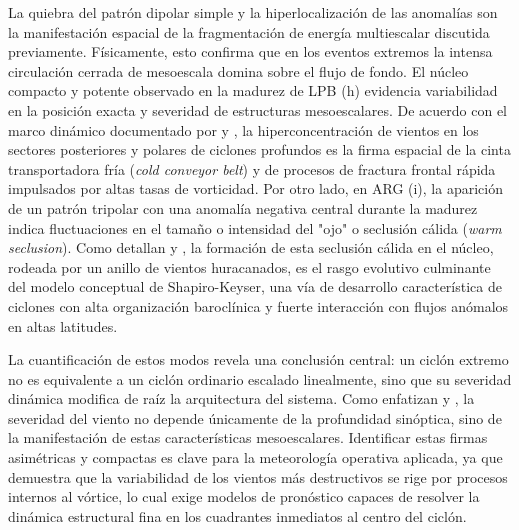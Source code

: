 La quiebra del patrón dipolar simple y la hiperlocalización de las anomalías son la manifestación espacial de la fragmentación de energía multiescalar discutida previamente. Físicamente, esto confirma que en los eventos extremos la intensa circulación cerrada de mesoescala domina sobre el flujo de fondo. El núcleo compacto y potente observado en la madurez de LPB (h) evidencia variabilidad en la posición exacta y severidad de estructuras mesoescalares. De acuerdo con el marco dinámico documentado por \citet{clark2005sting} y \citet{han2025system}, la hiperconcentración de vientos en los sectores posteriores y polares de ciclones profundos es la firma espacial de la cinta transportadora fría (\textit{cold conveyor belt}) y de procesos de fractura frontal rápida impulsados por altas tasas de vorticidad. Por otro lado, en ARG (i), la aparición de un patrón tripolar con una anomalía negativa central durante la madurez indica fluctuaciones en el tamaño o intensidad del "ojo" o seclusión cálida (\textit{warm seclusion}). Como detallan \citet{schultz2021antecedents} y \citet{reboita2022from}, la formación de esta seclusión cálida en el núcleo, rodeada por un anillo de vientos huracanados, es el rasgo evolutivo culminante del modelo conceptual de Shapiro-Keyser, una vía de desarrollo característica de ciclones con alta organización baroclínica y fuerte interacción con flujos anómalos en altas latitudes.

La cuantificación de estos modos revela una conclusión central: un ciclón extremo no es equivalente a un ciclón ordinario escalado linealmente, sino que su severidad dinámica modifica de raíz la arquitectura del sistema. Como enfatizan \citet{corner2025classification} y \citet{eisenstein2023identification}, la severidad del viento no depende únicamente de la profundidad sinóptica, sino de la manifestación de estas características mesoescalares. Identificar estas firmas asimétricas y compactas es clave para la meteorología operativa aplicada, ya que demuestra que la variabilidad de los vientos más destructivos se rige por procesos internos al vórtice, lo cual exige modelos de pronóstico capaces de resolver la dinámica estructural fina en los cuadrantes inmediatos al centro del ciclón.

